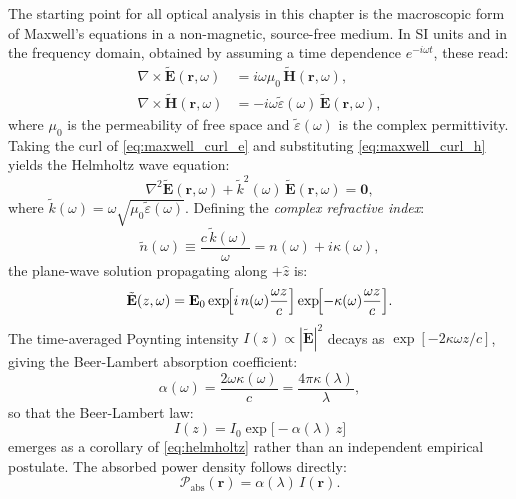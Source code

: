 The starting point for all optical analysis in this chapter is the macroscopic
form of Maxwell's equations in a non-magnetic, source-free medium. In SI units
and in the frequency domain, obtained by assuming a time dependence
$e^{-i\omega t}$, these read:
\begin{align}
    \nabla \times \tilde{\mathbf{E}}(\mathbf{r},\omega)
        &= i\omega\mu_0\,\tilde{\mathbf{H}}(\mathbf{r},\omega),
        \label{eq:maxwell_curl_e}\\
    \nabla \times \tilde{\mathbf{H}}(\mathbf{r},\omega)
        &= -i\omega\tilde{\varepsilon}(\omega)\,\tilde{\mathbf{E}}(\mathbf{r},\omega),
        \label{eq:maxwell_curl_h}
\end{align}
where $\mu_0$ is the permeability of free space and $\tilde{\varepsilon}(\omega)$
is the complex permittivity. Taking the curl of \cref{eq:maxwell_curl_e} and
substituting \cref{eq:maxwell_curl_h} yields the Helmholtz wave equation:
\begin{equation}
    \nabla^2\tilde{\mathbf{E}}(\mathbf{r},\omega)
    + \tilde{k}^2(\omega)\,\tilde{\mathbf{E}}(\mathbf{r},\omega) = \mathbf{0},
    \label{eq:helmholtz}
\end{equation}
where $\tilde{k}(\omega) = \omega\sqrt{\mu_0\tilde{\varepsilon}(\omega)}$.
Defining the \emph{complex refractive index}:
\begin{equation}
    \tilde{n}(\omega) \equiv \frac{c\,\tilde{k}(\omega)}{\omega}
    = n(\omega) + i\kappa(\omega),
    \label{eq:complex_n}
\end{equation}
the plane-wave solution propagating along $+\hat{z}$ is:
\begin{equation}
    \tilde{\mathbf{E}}(z,\omega)
    = \mathbf{E}_0
      \exp\!\Bigl[i\,n(\omega)\frac{\omega z}{c}\Bigr]
      \exp\!\Bigl[-\kappa(\omega)\frac{\omega z}{c}\Bigr].
    \label{eq:plane_wave}
\end{equation}
The time-averaged Poynting intensity $I(z)\propto|\tilde{\mathbf{E}}|^2$ decays
as $\exp[-2\kappa\omega z/c]$, giving the Beer-Lambert absorption coefficient:
\begin{equation}
    \alpha(\omega) = \frac{2\omega\kappa(\omega)}{c}
    = \frac{4\pi\kappa(\lambda)}{\lambda},
    \label{eq:alpha_kappa}
\end{equation}
so that the Beer-Lambert law:
\begin{equation}
    I(z) = I_0\exp\!\bigl[-\alpha(\lambda)\,z\bigr]
    \label{eq:beer_lambert}
\end{equation}
emerges as a corollary of \cref{eq:helmholtz} rather than an independent
empirical postulate. The absorbed power density follows directly:
\begin{equation}
    \mathcal{P}_{\mathrm{abs}}(\mathbf{r})
    = \alpha(\lambda)\,I(\mathbf{r}).
    \label{eq:abs_density}
\end{equation}

